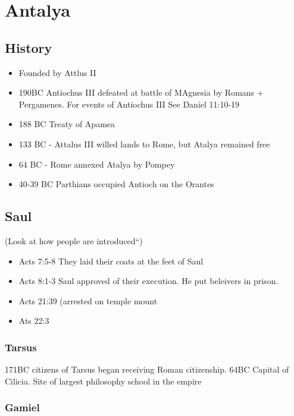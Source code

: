 \documentclass[
]{book}
\providecommand{\tightlist}{%
  \setlength{\itemsep}{0pt}\setlength{\parskip}{0pt}}
\begin{document}
\hypertarget{antalya}{%
\chapter{Antalya}\label{antalya}}

\hypertarget{history}{%
\section{History}\label{history}}

\begin{itemize}
\tightlist
\item
  Founded by Attlus II
\item
  190BC Antiochus III defeated at battle of MAgnesia by Romans + Pergamenes.
  For events of Antiochus III See Daniel 11:10-19
\item
  188 BC Treaty of Apamea
\item
  133 BC - Attalus III willed lands to Rome, but Atalya remained free
\item
  64 BC - Rome annexed Atalya by Pompey
\item
  40-39 BC Parthians occupied Antioch on the Orantes
\end{itemize}

\hypertarget{saul}{%
\section{Saul}\label{saul}}

(Look at how people are introduced``)

\begin{itemize}
\tightlist
\item
  Acts 7:5-8 They laid their coats at the feet of Saul
\item
  Acts 8:1-3 Saul approved of their execution. He put beleivers in prison.
\item
  Acts 21:39 (arrested on temple mount
\item
  Ats 22:3
\end{itemize}

\hypertarget{tarsus}{%
\subsection{Tarsus}\label{tarsus}}

171BC citizens of Tarsus began receiving Roman citizenship. 64BC Capital of Cilicia. Site of largest philosophy school in the empire

\hypertarget{gamiel}{%
\subsection{Gamiel}\label{gamiel}}
\end{document}
